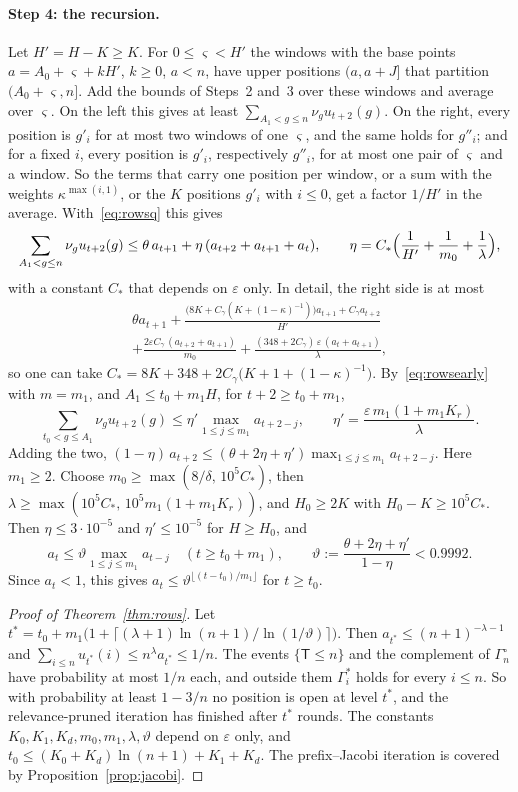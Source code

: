 \documentclass[11pt]{amsart}
\theoremstyle{definition}
\theoremstyle{remark}
\newcommand{\eps}{\varepsilon}
\begin{document}
\paragraph{Step 4: the recursion.}
Let $H'=H-K\ge K$. For $0\le\varsigma<H'$ the windows with the base points $a=A_0+\varsigma+kH'$,
$k\ge0$, $a<n$, have upper positions $(a,a+J]$ that partition $(A_0+\varsigma,n]$. Add the bounds
of Steps~2 and~3 over these windows and average over $\varsigma$. On the left this gives at least
$\sum_{A_1<g\le n}\nu_gu_{t+2}(g)$. On the right, every position is $g'_i$ for at most two windows
of one $\varsigma$, and the same holds for $g''_i$; and for a fixed $i$, every position is $g'_i$,
respectively $g''_i$, for at most one pair of $\varsigma$ and a window. So the terms that carry
one position per window, or a sum with the weights $\kappa^{\max(i,1)}$, or the $K$ positions
$g'_i$ with $i\le0$, get a factor $1/H'$ in the average. With~\eqref{eq:rowsq} this gives
\begin{equation}\label{eq:rowslaterec}
\sum_{A_1<g\le n}\nu_gu_{t+2}(g)\le\theta\,a_{t+1}+\eta\,(a_{t+2}+a_{t+1}+a_t),\qquad
\eta=C_*\Bigl(\frac1{H'}+\frac1{m_0}+\frac1\lambda\Bigr),
\end{equation}
with a constant $C_*$ that depends on $\eps$ only. In detail, the right side is at most
\begin{multline*}
\theta a_{t+1}+\frac{\bigl(8K+C_\gamma(K+(1-\kappa)^{-1})\bigr)a_{t+1}+C_\gamma a_{t+2}}{H'}\\
+\frac{2\eps C_\gamma\,(a_{t+2}+a_{t+1})}{m_0}+\frac{(348+2C_\gamma)\,\eps\,(a_t+a_{t+1})}{\lambda},
\end{multline*}
so one can take $C_*=8K+348+2C_\gamma\bigl(K+1+(1-\kappa)^{-1}\bigr)$. By~\eqref{eq:rowsearly} with
$m=m_1$, and $A_1\le t_0+m_1H$, for $t+2\ge t_0+m_1$,
\[
\sum_{t_0<g\le A_1}\nu_gu_{t+2}(g)\le\eta'\max_{1\le j\le m_1}a_{t+2-j},\qquad\eta'=\frac{\eps\,m_1(1+m_1K_r)}{\lambda}.
\]
Adding the two, $(1-\eta)\,a_{t+2}\le(\theta+2\eta+\eta')\max_{1\le j\le m_1}a_{t+2-j}$. Here $m_1\ge2$. Choose
$m_0\ge\max(8/\delta,\,10^5C_*)$, then $\lambda\ge\max(10^5C_*,\,10^5m_1(1+m_1K_r))$, and
$H_0\ge2K$ with $H_0-K\ge10^5C_*$. Then $\eta\le3\cdot10^{-5}$ and $\eta'\le10^{-5}$ for
$H\ge H_0$, and
\[
a_t\le\vartheta\max_{1\le j\le m_1}a_{t-j}\quad(t\ge t_0+m_1),\qquad\vartheta:=\frac{\theta+2\eta+\eta'}{1-\eta}<0.9992 .
\]
Since $a_t<1$, this gives $a_t\le\vartheta^{\lfloor(t-t_0)/m_1\rfloor}$ for $t\ge t_0$.

\begin{proof}[Proof of Theorem~\ref{thm:rows}]
Let $t^*=t_0+m_1\bigl(1+\lceil(\lambda+1)\ln(n+1)/\ln(1/\vartheta)\rceil\bigr)$. Then $a_{t^*}\le(n+1)^{-\lambda-1}$ and
$\sum_{i\le n}u_{t^*}(i)\le n^\lambda a_{t^*}\le1/n$. The
events $\{\mathsf T\le n\}$ and the complement of $\Gamma^\circ_n$ have probability at most $1/n$
each, and outside them $\Gamma^*_i$ holds for every $i\le n$. So with probability at least $1-3/n$
no position is open at level $t^*$, and the relevance-pruned iteration has finished after $t^*$
rounds. The constants $K_0,K_1,K_d,m_0,m_1,\lambda,\vartheta$ depend on $\eps$ only, and
$t_0\le(K_0+K_d)\ln(n+1)+K_1+K_d$. The prefix--Jacobi iteration is covered by
Proposition~\ref{prop:jacobi}.
\end{proof}
\end{document}
